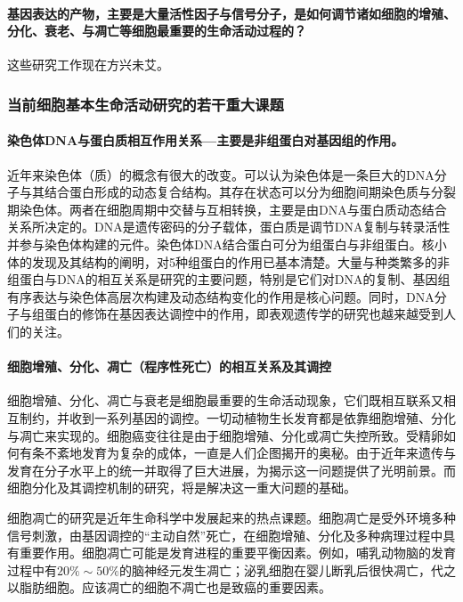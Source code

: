 \paragraph{基因表达的产物，主要是大量活性因子与信号分子，是如何调节诸如细胞的增殖、分化、衰老、与凋亡等细胞最重要的生命活动过程的？}
这些研究工作现在方兴未艾。

\subsubsection{当前细胞基本生命活动研究的若干重大课题}

\paragraph{染色体DNA与蛋白质相互作用关系---主要是非组蛋白对基因组的作用。}
近年来染色体（质）的概念有很大的改变。可以认为染色体是一条巨大的DNA分子与其结合蛋白形成的动态复合结构。其存在状态可以分为细胞间期染色质与分裂期染色体。两者在细胞周期中交替与互相转换，主要是由DNA与蛋白质动态结合关系所决定的。DNA是遗传密码的分子载体，蛋白质是调节DNA复制与转录活性并参与染色体构建的元件。染色体DNA结合蛋白可分为组蛋白与非组蛋白。核小体的发现及其结构的阐明，对5种组蛋白的作用已基本清楚。大量与种类繁多的非组蛋白与DNA的相互关系是研究的主要问题，特别是它们对DNA的复制、基因组有序表达与染色体高层次构建及动态结构变化的作用是核心问题。同时，DNA分子与组蛋白的修饰在基因表达调控中的作用，即表观遗传学的研究也越来越受到人们的关注。

\paragraph{细胞增殖、分化、凋亡（程序性死亡）的相互关系及其调控}
细胞增殖、分化、凋亡与衰老是细胞最重要的生命活动现象，它们既相互联系又相互制约，并收到一系列基因的调控。一切动植物生长发育都是依靠细胞增殖、分化与凋亡来实现的。细胞癌变往往是由于细胞增殖、分化或凋亡失控所致。受精卵如何有条不紊地发育为复杂的成体，一直是人们企图揭开的奥秘。由于近年来遗传与发育在分子水平上的统一并取得了巨大进展，为揭示这一问题提供了光明前景。而细胞分化及其调控机制的研究，将是解决这一重大问题的基础。

细胞凋亡的研究是近年生命科学中发展起来的热点课题。细胞凋亡是受外环境多种信号刺激，由基因调控的``主动自然''死亡，在细胞增殖、分化及多种病理过程中具有重要作用。细胞凋亡可能是发育进程的重要平衡因素。例如，哺乳动物脑的发育过程中有$20 \%\sim 50\% $的脑神经元发生凋亡；泌乳细胞在婴儿断乳后很快凋亡，代之以脂肪细胞。应该凋亡的细胞不凋亡也是致癌的重要因素。

